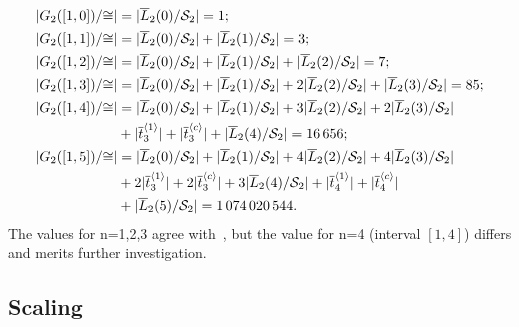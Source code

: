 \documentclass[a4paper]{article}
\begin{document}
\begin{align}
|G_2([1,0])/{\cong}| & = |\overline{L}_2(0) / \mathcal{S}_2| = 1; \notag \\
|G_2([1,1])/{\cong}| & = |\overline{L}_2(0) / \mathcal{S}_2| + |\overline{L}_2(1) / \mathcal{S}_2| = 3; \notag \\
|G_2([1,2])/{\cong}| & = |\overline{L}_2(0) / \mathcal{S}_2| + |\overline{L}_2(1) / \mathcal{S}_2|
+ |\overline{L}_2(2) / \mathcal{S}_2| = 7; \notag \\
|G_2([1,3])/{\cong}| & = |\overline{L}_2(0) / \mathcal{S}_2| +  |\overline{L}_2(1) / \mathcal{S}_2|
+ 2 |\overline{L}_2(2) / \mathcal{S}_2|
 + |\overline{L}_2(3) / \mathcal{S}_2| = 85; \label{eq:classes85}\\
|G_2([1,4])/{\cong}| & = |\overline{L}_2(0) / \mathcal{S}_2| + |\overline{L}_2(1) / \mathcal{S}_2|
+ 3 |\overline{L}_2(2) / \mathcal{S}_2| + 2 |\overline{L}_2(3) / \mathcal{S}_2| \notag \\
& + |\overline{t}^{\langle 1 \rangle}_3| + |\overline{t}^{\langle c \rangle}_3|
+ |\overline{L}_2(4) / \mathcal{S}_2| = 16\,656; \notag \\
|G_2([1,5])/{\cong}| & = |\overline{L}_2(0) / \mathcal{S}_2| + |\overline{L}_2(1) / \mathcal{S}_2|
+ 4 |\overline{L}_2(2) / \mathcal{S}_2|+ 4 |\overline{L}_2(3) / \mathcal{S}_2| \notag \\
& + 2|\overline{t}^{\langle 1 \rangle}_3| + 2|\overline{t}^{\langle c \rangle}_3|
+ 3 |\overline{L}_2(4) / \mathcal{S}_2| + |\overline{t}^{\langle 1 \rangle}_4| + |\overline{t}^{\langle c \rangle}_4| \notag \\
& +  |\overline{L}_2(5) / \mathcal{S}_2| = 1\,074\,020\,544 \notag.
\end{align}
The values for n=1,2,3 agree with~\cite{RUIVO2018280}, but the value for n=4 (interval $[1,4]$) differs and merits further investigation.

\subsection{Scaling}
\end{document}

